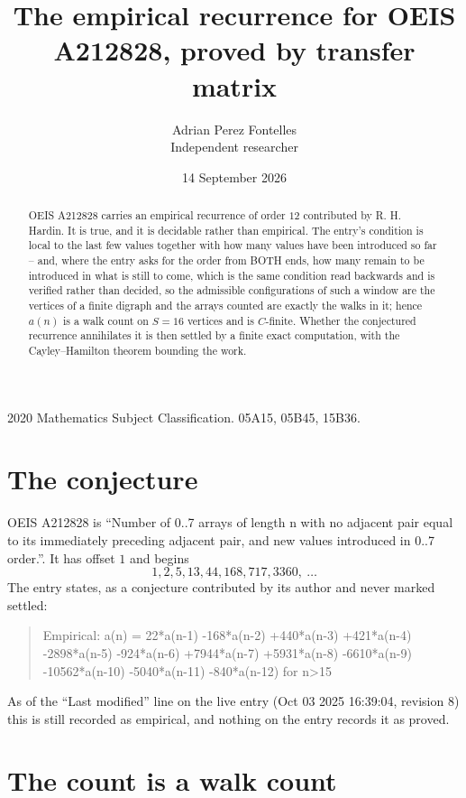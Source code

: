 \documentclass[11pt,a4paper]{article}
\title{The empirical recurrence for OEIS A212828, proved by transfer matrix}
\author{Adrian Perez Fontelles\\ \small Independent researcher}
\date{14 September 2026}
\theoremstyle{plain}
\theoremstyle{definition}
\begin{document}
\maketitle

\begin{abstract}
OEIS A212828 carries an empirical recurrence of order $12$ contributed by R. H. Hardin. It is
true, and it is decidable rather than empirical. The entry's condition is local to the last few values together with how many values have been introduced so far -- and, where the entry asks for the order from BOTH ends, how many remain to be introduced in what is still to come, which is the same condition read backwards and is verified rather than decided, so
the admissible configurations of such a window are the vertices of a finite digraph and the
arrays counted are exactly the walks in it; hence $a(n)$ is a walk count on $S=16$ vertices
and is $C$-finite. Whether the conjectured recurrence annihilates it is then settled by a
finite exact computation, with the Cayley--Hamilton theorem bounding the work.
\end{abstract}

\noindent\small 2020 Mathematics Subject Classification. 05A15, 05B45, 15B36.\normalsize

\section{The conjecture}

OEIS A212828 is ``Number of 0..7 arrays of length n with no adjacent pair equal to its immediately preceding adjacent pair, and new values introduced in 0..7 order.''. It has offset $1$ and begins
\[
1, 2, 5, 13, 44, 168, 717, 3360,\ \dots
\]
The entry states, as a conjecture contributed by its author and never marked settled:
\begin{quote}
Empirical: a(n) = 22*a(n-1) -168*a(n-2) +440*a(n-3) +421*a(n-4) -2898*a(n-5) -924*a(n-6) +7944*a(n-7) +5931*a(n-8) -6610*a(n-9) -10562*a(n-10) -5040*a(n-11) -840*a(n-12) for n>15
\end{quote}
As of the ``Last modified'' line on the live entry (Oct 03 2025 16:39:04, revision 8) this is still
recorded as empirical, and nothing on the entry records it as proved.

\section{The count is a walk count}
\end{document}
